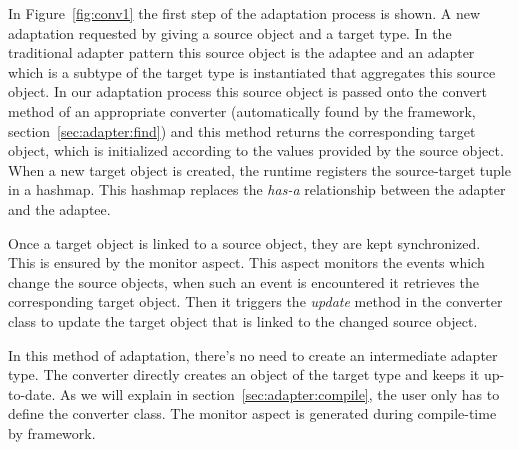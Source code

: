 In Figure~\ref{fig:conv1} the first step of the adaptation process is shown. 
A new adaptation requested by giving a source object and a target type. 
In the traditional adapter pattern this source object is the adaptee and an adapter which is a subtype of the target type is instantiated that aggregates this source object. 
In our adaptation process this source object is passed onto the convert method of an appropriate converter (automatically found by the framework, section~\ref{sec:adapter:find}) and this method returns the corresponding target object, which is initialized according to the values provided by the source object. 
When a new target object is created, the \zamk runtime registers the source-target tuple in a hashmap. 
This hashmap replaces the \emph{has-a} relationship between the adapter and the adaptee. 


Once a target object is linked to a source object, they are kept synchronized. 
This is ensured by the monitor aspect. 
This aspect monitors the events which change the source objects, when such an event is encountered it retrieves the corresponding target object. 
Then it triggers the \emph{update} method in the converter class to update the target object that is linked to the changed source object.

\begin{figure}
\end{figure}

In this method of adaptation, there's no need to create an intermediate adapter type.
The converter directly creates an object of the target type and keeps it up-to-date. 
As we will explain in section~\ref{sec:adapter:compile}, the user only has to define the converter class. 
The monitor aspect is generated during compile-time by \zamk framework. 


